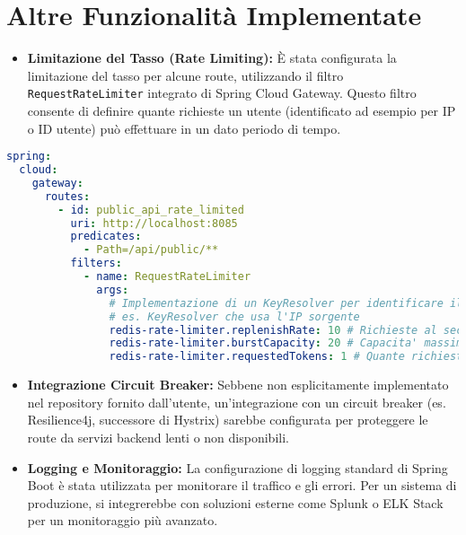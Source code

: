 \section{Altre Funzionalità Implementate}
\begin{itemize}
    \item \textbf{Limitazione del Tasso (Rate Limiting):} È stata configurata la limitazione del tasso per alcune route, utilizzando il filtro \texttt{RequestRateLimiter} integrato di Spring Cloud Gateway. Questo filtro consente di definire quante richieste un utente (identificato ad esempio per IP o ID utente) può effettuare in un dato periodo di tempo.
\end{itemize}
\begin{lstlisting}[language=yaml, caption=Configurazione YAML per Rate Limiting]
spring:
  cloud:
    gateway:
      routes:
        - id: public_api_rate_limited
          uri: http://localhost:8085
          predicates:
            - Path=/api/public/**
          filters:
            - name: RequestRateLimiter
              args:
                # Implementazione di un KeyResolver per identificare il client
                # es. KeyResolver che usa l'IP sorgente
                redis-rate-limiter.replenishRate: 10 # Richieste al secondo
                redis-rate-limiter.burstCapacity: 20 # Capacita' massima di burst
                redis-rate-limiter.requestedTokens: 1 # Quante richieste per token
\end{lstlisting}
\begin{itemize}
    \item \textbf{Integrazione Circuit Breaker:} Sebbene non esplicitamente implementato nel repository fornito dall'utente, un'integrazione con un circuit breaker (es. Resilience4j, successore di Hystrix) sarebbe configurata per proteggere le route da servizi backend lenti o non disponibili.
    \item \textbf{Logging e Monitoraggio:} La configurazione di logging standard di Spring Boot è stata utilizzata per monitorare il traffico e gli errori. Per un sistema di produzione, si integrerebbe con soluzioni esterne come Splunk o ELK Stack per un monitoraggio più avanzato.
\end{itemize}

